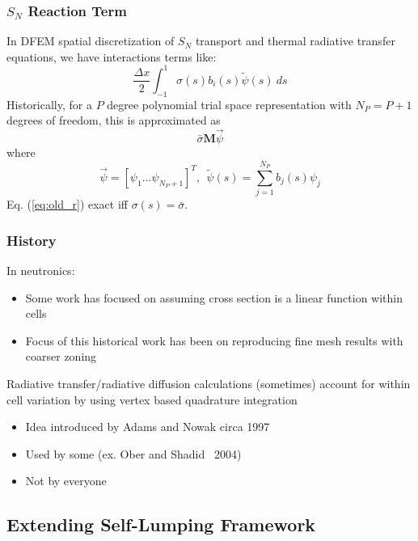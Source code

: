 \documentclass{beamer}
\newcommand{\be}{\begin{equation*}}   %
\newcommand{\ee}{\end{equation*}}
\newcommand{\benum}{\begin{equation}}   %
\newcommand{\eenum}{\end{equation}}
\newcommand{\eqt}[1]{Eq. (\ref{#1})}  %
\newcommand{\B}[1]{\ensuremath{b_{#1} }}			%
\begin{document}
\begin{frame}
\frametitle{$S_N$ Reaction Term}
In DFEM spatial discretization of $S_N$ transport and thermal radiative transfer equations, we have interactions terms like:
\benum
\frac{\Delta x}{2} \int_{-1}^{1}{\sigma(s) \B{i}(s) \widetilde{\psi}(s)~ds} 
\label{eq:exact_r}
\eenum
Historically, for a $P$ degree polynomial trial space representation with $N_P = P+1$ degrees of freedom, this is approximated as
\benum
\bar{\sigma} \mathbf{M} \vec{\psi}
\label{eq:old_r}
\eenum
where 
\be
\vec{\psi} = \left[ \psi_1 \dots \psi_{N_P+1} \right]^T,~~\widetilde{\psi}(s) = \sum_{j=1}^{N_P}{\B{j}(s) \psi_j}
\ee
\eqt{eq:old_r} exact iff $\sigma(s) = \bar{\sigma}$. 
\end{frame}

\begin{frame}
\frametitle{History}
In neutronics:
\begin{itemize}
\item Some work has focused on assuming cross section is a linear function within cells
\item Focus of this historical work has been on reproducing fine mesh results with coarser zoning
\end{itemize}
Radiative transfer/radiative diffusion calculations (sometimes) account for within cell variation by using vertex based quadrature integration
\begin{itemize}
\item Idea introduced by Adams and Nowak circa 1997
\item Used by some (ex. Ober and Shadid ~2004)
\item Not by everyone
\end{itemize}
\end{frame}

\subsection{Extending Self-Lumping Framework}
\end{document}

